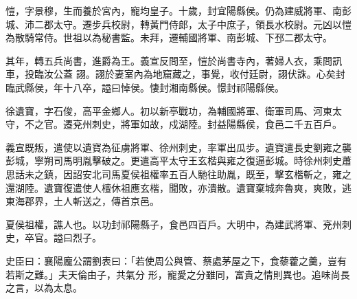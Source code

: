 \begin{pinyinscope}
 愷，字景穆，生而養於宮內，寵均皇子。十歲，封宜陽縣侯。仍為建威將軍、南彭城、沛二郡太守。遷步兵校尉，轉黃門侍郎，太子中庶子，領長水校尉。元凶以愷為散騎常侍。世祖以為秘書監。未拜，遷輔國將軍、南彭城、下邳二郡太守。



 其年，轉五兵尚書，進爵為王。義宣反問至，愷於尚書寺內，著婦人衣，乘問訊車，投臨汝公蓋
 詡。詡於妻室內為地窟藏之，事覺，收付廷尉，詡伏誅。心矣封臨武縣侯，年十八卒，謚曰悼侯。悽封湘南縣侯。憬封祁陽縣侯。



 徐遺寶，字石俊，高平金鄉人。初以新亭戰功，為輔國將軍、衛軍司馬、河東太守，不之官。遷兗州刺史，將軍如故，戍湖陸。封益陽縣侯，食邑二千五百戶。



 義宣既叛，遣使以遺寶為征虜將軍、徐州刺史，率軍出瓜步。遺寶遣長史劉雍之襲彭城，寧朔司馬明胤擊破之。更遣高平太守王玄楷與雍之復逼彭城。時徐州刺史蕭
 思話未之鎮，因詔安北司馬夏侯祖權率五百人馳往助胤，既至，擊玄楷斬之，雍之還湖陸。遺寶復遣使人檀休祖應玄楷，聞敗，亦潰散。遺寶棄城奔魯爽，爽敗，逃東海郡界，土人斬送之，傳首京邑。



 夏侯祖權，譙人也。以功封祁陽縣子，食邑四百戶。大明中，為建武將軍、兗州刺史，卒官。謚曰烈子。



 史臣曰：襄陽龐公謂劉表曰：「若使周公與管、蔡處茅屋之下，食藜藿之羹，豈有若斯之難。」夫天倫由子，共氣分
 形，寵愛之分雖同，富貴之情則異也。追味尚長之言，以為太息。



\end{pinyinscope}